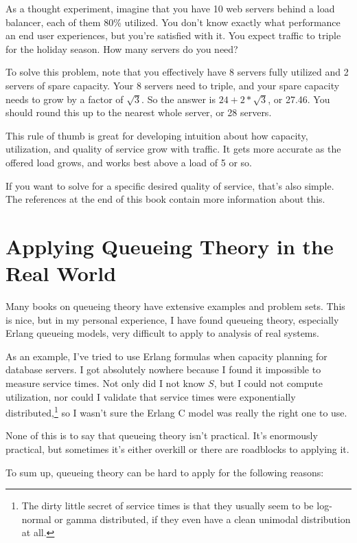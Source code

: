\documentclass{vivid_layout_pdf}
\begin{document}
As a thought experiment, imagine that you have 10 web servers behind a load
balancer, each of them 80\% utilized. You don't know exactly what performance an
end user experiences, but you're satisfied with it. You expect traffic to triple
for the holiday season. How many servers do you need?

To solve this problem, note that you effectively have 8 servers fully utilized
and 2 servers of spare capacity. Your 8 servers need to triple, and your spare
capacity needs to grow by a factor of \( \sqrt{3} \). So the answer is \( 24 +
2*\sqrt{3} \), or 27.46. You should round this up to the nearest whole server,
or 28 servers.

This rule of thumb is great for developing intuition about how capacity,
utilization, and quality of service grow with traffic. It gets more accurate as
the offered load grows, and works best above a load of 5 or so.

If you want to solve for a specific desired quality of service, that's also
simple. The references at the end of this book contain more information about
this.

\section{Applying Queueing Theory in the Real World}

Many books on queueing theory have extensive examples and problem sets. This is nice, but in my personal experience, I have found queueing theory, especially Erlang queueing models, very difficult to apply to analysis of real systems.

As an example, I've tried to use Erlang formulas when capacity planning for database servers. I got absolutely nowhere because I found it impossible to measure service times. Not only did I not know $S$, but I could not compute utilization, nor could I validate that service times were exponentially distributed,\footnote{The dirty little secret of service times is that they usually seem to be log-normal or gamma distributed, if they even have a clean unimodal distribution at all.} so I wasn't sure the Erlang C model was really the right one to use.

None of this is to say that queueing theory isn't practical. It's enormously practical, but sometimes it's either overkill or there are roadblocks to applying it.

To sum up, queueing theory can be hard to apply for the following reasons:
\end{document}
